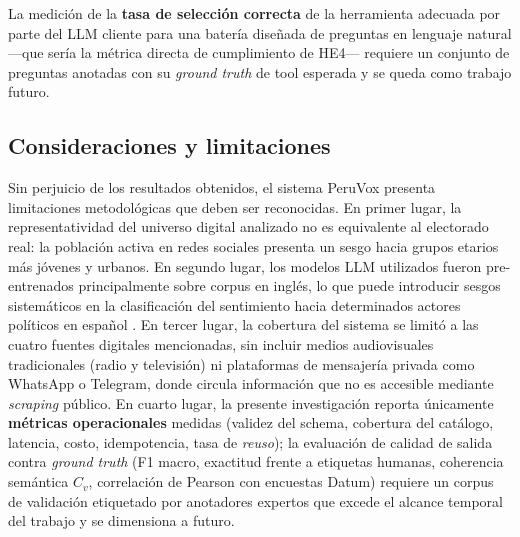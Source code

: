 La medición de la \textbf{tasa de selección correcta} de la herramienta adecuada
por parte del LLM cliente para una batería diseñada de preguntas en lenguaje
natural —que sería la métrica directa de cumplimiento de HE4— requiere un
conjunto de preguntas anotadas con su \textit{ground truth} de tool esperada y se
queda como trabajo futuro.
\subsection*{Consideraciones y limitaciones}
Sin perjuicio de los resultados obtenidos, el sistema PeruVox presenta limitaciones
metodológicas que deben ser reconocidas. En primer lugar, la representatividad del
universo digital analizado no es equivalente al electorado real: la población
activa en redes sociales presenta un sesgo hacia grupos etarios más jóvenes y
urbanos. En segundo lugar, los modelos LLM utilizados fueron pre-entrenados
principalmente sobre corpus en inglés, lo que puede introducir sesgos sistemáticos
en la clasificación del sentimiento hacia determinados actores políticos en español
\parencite{pr_gujral2024llm_elections}. En tercer lugar, la cobertura del sistema
se limitó a las cuatro fuentes digitales mencionadas, sin incluir medios
audiovisuales tradicionales (radio y televisión) ni plataformas de mensajería
privada como WhatsApp o Telegram, donde circula información que no es accesible
mediante \textit{scraping} público. En cuarto lugar, la presente investigación
reporta únicamente \textbf{métricas operacionales} medidas (validez del schema,
cobertura del catálogo, latencia, costo, idempotencia, tasa de \textit{reuso});
la evaluación de calidad de salida contra \textit{ground truth} (F1 macro,
exactitud frente a etiquetas humanas, coherencia semántica $C_v$, correlación de
Pearson con encuestas Datum) requiere un corpus de validación etiquetado por
anotadores expertos que excede el alcance temporal del trabajo y se dimensiona
a futuro.
